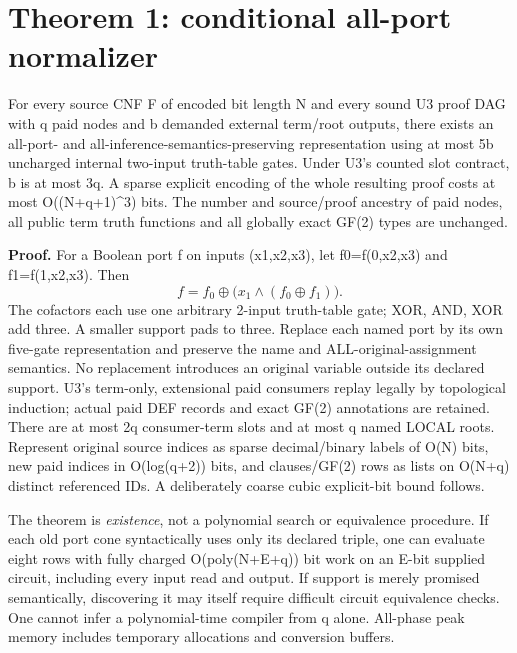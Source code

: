 \documentclass{article}
\begin{document}
\section*{Theorem 1: conditional all-port normalizer}
For every source CNF F of encoded bit length N and every sound U3 proof DAG with q paid nodes and b demanded external term/root outputs, there exists an all-port- and all-inference-semantics-preserving representation using at most 5b uncharged internal two-input truth-table gates. Under U3's counted slot contract, b is at most 3q. A sparse explicit encoding of the whole resulting proof costs at most O((N+q+1)^3) bits. The number and source/proof ancestry of paid nodes, all public term truth functions and all globally exact GF(2) types are unchanged.

\textbf{Proof.} For a Boolean port f on inputs (x1,x2,x3), let f0=f(0,x2,x3) and f1=f(1,x2,x3). Then
\[
 f=f_0\oplus\bigl(x_1\wedge(f_0\oplus f_1)\bigr).
\]
The cofactors each use one arbitrary 2-input truth-table gate; XOR, AND, XOR add three. A smaller support pads to three. Replace each named port by its own five-gate representation and preserve the name and ALL-original-assignment semantics. No replacement introduces an original variable outside its declared support. U3's term-only, extensional paid consumers replay legally by topological induction; actual paid DEF records and exact GF(2) annotations are retained. There are at most 2q consumer-term slots and at most q named LOCAL roots. Represent original source indices as sparse decimal/binary labels of O(N) bits, new paid indices in O(log(q+2)) bits, and clauses/GF(2) rows as lists on O(N+q) distinct referenced IDs. A deliberately coarse cubic explicit-bit bound follows.

The theorem is \emph{existence}, not a polynomial search or equivalence procedure. If each old port cone syntactically uses only its declared triple, one can evaluate eight rows with fully charged O(poly(N+E+q)) bit work on an E-bit supplied circuit, including every input read and output. If support is merely promised semantically, discovering it may itself require difficult circuit equivalence checks. One cannot infer a polynomial-time compiler from q alone. All-phase peak memory includes temporary allocations and conversion buffers.
\end{document}
